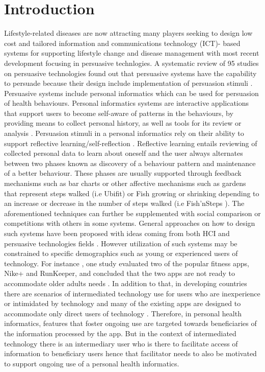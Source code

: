 \documentclass{sig-alternate}
\begin{document}
\section{Introduction} 
Lifestyle-related diseases are now attracting many players seeking to design low cost and tailored information and communications technology (ICT)- based systems for supporting lifestyle change and disease management\cite{arsand:mobile} with most recent development focusing in persuasive technlogies. A systematic review of 95 studies on persuasive technologies found out that persuasive systems have the capability to persuade because their design include implementation of persuasion stimuli \cite{hamari2014persuasive}.\newline
Persuasive systems include personal informatics which can be used for persuasion of health behaviours. Personal informatics systems are interactive applications that support users to become self-aware of patterns in the behaviours, by providing means to collect personal history, as well as tools for its review or analysis \cite{li2011:personal,li2012:personal}. Persuasion stimuli in a personal informatics rely on their ability to support reflective learning/self-reflection \cite{li2011:understanding}. Reflective learning entails reviewing of collected personal data to learn about oneself and the user always alternates between two phases known as discovery of a behaviour pattern and maintenance of a better behaviour\cite{li2011:understanding}. These phases are usually supported through feedback mechanisms such as bar charts or other affective mechanisms such as gardens that represent steps walked (i.e Ubifit\cite{klasnja2009:using}) or Fish growing or shrinking depending to an increase or decrease in the number of steps walked (i.e Fish'nSteps \cite{lin2006:fish}). The aforementioned techniques can further be supplemented with social comparison\cite{Oinas-kukkonen:psd} or competitions with others \cite{comber2013:designing} in some systems. General approaches on how to design such systems have been proposed with ideas coming from both HCI\cite{li2010:stage} and persuasive technologies fields \cite{fogg2009:behavior,Oinas-kukkonen:psd,Oinas-Kukkonen:foundation}.  \newline
However utilization of such systems may be constrained to specific demographics such as young or experienced users of technology. For instance , one study evaluated two of the popular fitness apps, Nike+ and RunKeeper, and concluded that the two apps are not ready to accommodate older adults needs \cite{silva2014:smartphones}. In addition to that, in developing countries there are scenarios of intermediated technology use for users who are inexperience or intimidated by technology and many of the existing apps are designed to accommodate only direct users of technology \cite{sambasivan2010}. Therefore, in personal health informatics, features that foster ongoing use are targeted towards beneficiaries of the information processed by the app. But in the context of intermediated technology there is an intermediary user who is there to facilitate access of information to beneficiary users hence that facilitator needs to also be motivated to support ongoing use of a personal health informatics.\newline
\end{document}
